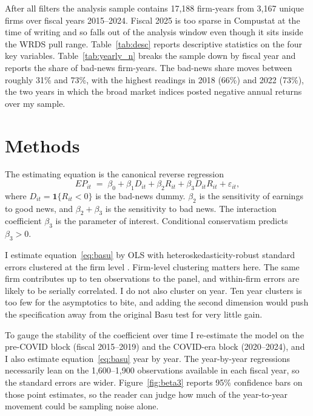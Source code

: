 \documentclass[12pt]{article}
\begin{document}
After all filters the analysis sample contains 17{,}188 firm-years from 3{,}167 unique firms over fiscal years 2015--2024. Fiscal 2025 is too sparse in Compustat at the time of writing and so falls out of the analysis window even though it sits inside the WRDS pull range. Table~\ref{tab:desc} reports descriptive statistics on the four key variables. Table~\ref{tab:yearly_n} breaks the sample down by fiscal year and reports the share of bad-news firm-years. The bad-news share moves between roughly 31\% and 73\%, with the highest readings in 2018 (66\%) and 2022 (73\%), the two years in which the broad market indices posted negative annual returns over my sample.

\section{Methods}
\label{sec:methods}
The estimating equation is the canonical \citet{basu1997} reverse regression
\begin{equation}
  EP_{it} \;=\; \beta_{0} + \beta_{1}D_{it} + \beta_{2}R_{it}
        + \beta_{3} D_{it} R_{it} + \varepsilon_{it},
  \label{eq:basu}
\end{equation}
where $D_{it} = \mathbf{1}\{R_{it} < 0\}$ is the bad-news dummy. $\beta_{2}$ is the sensitivity of earnings to good news, and $\beta_{2} + \beta_{3}$ is the sensitivity to bad news. The interaction coefficient $\beta_{3}$ is the parameter of interest. Conditional conservatism predicts $\beta_{3} > 0$.

I estimate equation~\eqref{eq:basu} by OLS with heteroskedasticity-robust standard errors clustered at the firm level \citep{petersen2009}. Firm-level clustering matters here. The same firm contributes up to ten observations to the panel, and within-firm errors are likely to be serially correlated. I do not also cluster on year. Ten year clusters is too few for the asymptotics to bite, and adding the second dimension would push the specification away from the original Basu test for very little gain.

To gauge the stability of the coefficient over time I re-estimate the model on the pre-COVID block (fiscal 2015--2019) and the COVID-era block (2020--2024), and I also estimate equation~\eqref{eq:basu} year by year. The year-by-year regressions necessarily lean on the 1{,}600--1{,}900 observations available in each fiscal year, so the standard errors are wider. Figure~\ref{fig:beta3} reports 95\% confidence bars on those point estimates, so the reader can judge how much of the year-to-year movement could be sampling noise alone.
\end{document}

